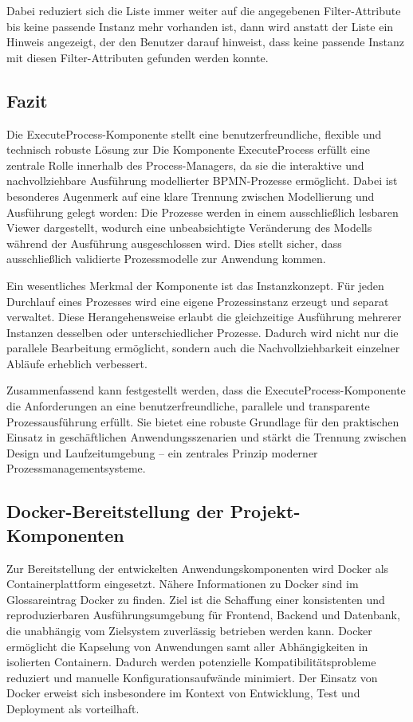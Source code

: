 
Dabei reduziert sich die Liste immer weiter auf die angegebenen Filter-Attribute bis keine passende Instanz mehr vorhanden ist, dann wird anstatt der Liste ein Hinweis angezeigt, der den Benutzer darauf hinweist, dass keine passende Instanz mit diesen Filter-Attributen gefunden werden konnte.


\subsection*{Fazit}
Die ExecuteProcess-Komponente stellt eine benutzerfreundliche, flexible und technisch robuste Lösung zur Die Komponente ExecuteProcess erfüllt eine zentrale Rolle innerhalb des Process-Managers, da sie die interaktive und nachvollziehbare Ausführung modellierter BPMN-Prozesse ermöglicht. Dabei ist besonderes Augenmerk auf eine klare Trennung zwischen Modellierung und Ausführung gelegt worden: Die Prozesse werden in einem ausschließlich lesbaren Viewer dargestellt, wodurch eine unbeabsichtigte Veränderung des Modells während der Ausführung ausgeschlossen wird. Dies stellt sicher, dass ausschließlich validierte Prozessmodelle zur Anwendung kommen.

Ein wesentliches Merkmal der Komponente ist das Instanzkonzept. Für jeden Durchlauf eines Prozesses wird eine eigene Prozessinstanz erzeugt und separat verwaltet. Diese Herangehensweise erlaubt die gleichzeitige Ausführung mehrerer Instanzen desselben oder unterschiedlicher Prozesse. Dadurch wird nicht nur die parallele Bearbeitung ermöglicht, sondern auch die Nachvollziehbarkeit einzelner Abläufe erheblich verbessert.

Zusammenfassend kann festgestellt werden, dass die ExecuteProcess-Komponente die Anforderungen an eine benutzerfreundliche, parallele und transparente Prozessausführung erfüllt. Sie bietet eine robuste Grundlage für den praktischen Einsatz in geschäftlichen Anwendungsszenarien und stärkt die Trennung zwischen Design und Laufzeitumgebung – ein zentrales Prinzip moderner Prozessmanagementsysteme.



\newpage
\subsection{Docker-Bereitstellung der Projekt-Komponenten} \label{docker}
Zur Bereitstellung der entwickelten Anwendungskomponenten wird Docker als Containerplattform eingesetzt. Nähere Informationen zu Docker sind im Glossareintrag \gls{Docker} zu finden. Ziel ist die Schaffung einer konsistenten und reproduzierbaren Ausführungsumgebung für Frontend, Backend und Datenbank, die unabhängig vom Zielsystem zuverlässig betrieben werden kann. Docker ermöglicht die Kapselung von Anwendungen samt aller Abhängigkeiten in isolierten Containern. Dadurch werden potenzielle Kompatibilitätsprobleme reduziert und manuelle Konfigurationsaufwände minimiert. Der Einsatz von Docker erweist sich insbesondere im Kontext von Entwicklung, Test und Deployment als vorteilhaft.

